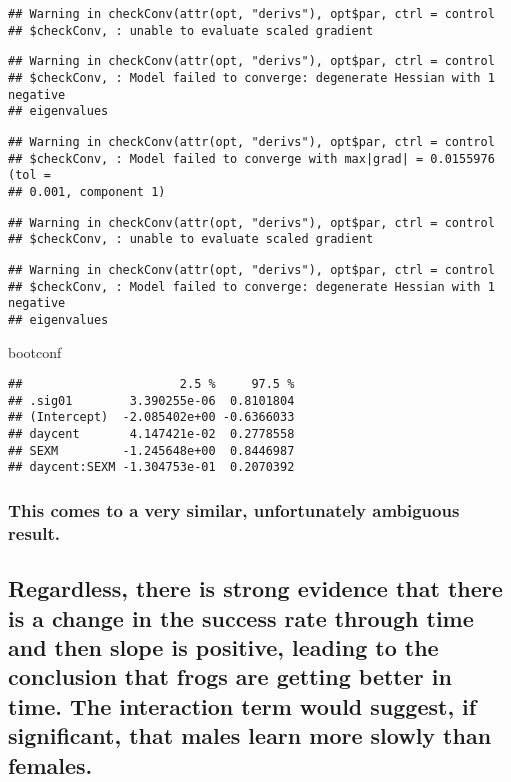 \documentclass[]{article}
\newenvironment{Shaded}{\begin{snugshade}}{\end{snugshade}}
\newcommand{\NormalTok}[1]{#1}
\begin{document}
\begin{verbatim}
## Warning in checkConv(attr(opt, "derivs"), opt$par, ctrl = control
## $checkConv, : unable to evaluate scaled gradient
\end{verbatim}

\begin{verbatim}
## Warning in checkConv(attr(opt, "derivs"), opt$par, ctrl = control
## $checkConv, : Model failed to converge: degenerate Hessian with 1 negative
## eigenvalues
\end{verbatim}

\begin{verbatim}
## Warning in checkConv(attr(opt, "derivs"), opt$par, ctrl = control
## $checkConv, : Model failed to converge with max|grad| = 0.0155976 (tol =
## 0.001, component 1)
\end{verbatim}

\begin{verbatim}
## Warning in checkConv(attr(opt, "derivs"), opt$par, ctrl = control
## $checkConv, : unable to evaluate scaled gradient
\end{verbatim}

\begin{verbatim}
## Warning in checkConv(attr(opt, "derivs"), opt$par, ctrl = control
## $checkConv, : Model failed to converge: degenerate Hessian with 1 negative
## eigenvalues
\end{verbatim}

\begin{Shaded}
\begin{Highlighting}[]
\NormalTok{bootconf}
\end{Highlighting}
\end{Shaded}

\begin{verbatim}
##                      2.5 %     97.5 %
## .sig01        3.390255e-06  0.8101804
## (Intercept)  -2.085402e+00 -0.6366033
## daycent       4.147421e-02  0.2778558
## SEXM         -1.245648e+00  0.8446987
## daycent:SEXM -1.304753e-01  0.2070392
\end{verbatim}

\subsubsection{This comes to a very similar, unfortunately ambiguous
result.}\label{this-comes-to-a-very-similar-unfortunately-ambiguous-result.}

\subsection{Regardless, there is strong evidence that there is a change
in the success rate through time and then slope is positive, leading to
the conclusion that frogs are getting better in time. The interaction
term would suggest, if significant, that males learn more slowly than
females.}\label{regardless-there-is-strong-evidence-that-there-is-a-change-in-the-success-rate-through-time-and-then-slope-is-positive-leading-to-the-conclusion-that-frogs-are-getting-better-in-time.-the-interaction-term-would-suggest-if-significant-that-males-learn-more-slowly-than-females.}
\end{document}
